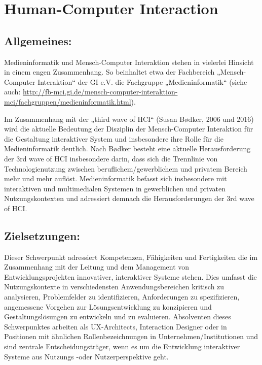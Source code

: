 \chapter{Human-Computer Interaction}\label{human-computer-interaction}

\section*{Allgemeines:}\label{allgemeines}

Medieninformatik und Mensch-Computer Interaktion stehen in vielerlei
Hinsicht in einem engen Zusammenhang. So beinhaltet etwa der Fachbereich
„Mensch-Computer Interaktion`` der GI e.V. die Fachgruppe
„Medieninformatik`` (siehe auch:
\url{http://fb-mci.gi.de/mensch-computer-interaktion-mci/fachgruppen/medieninformatik.html}).

Im Zusammenhang mit der „third wave of HCI`` (Susan Bødker, 2006 und
2016) wird die aktuelle Bedeutung der Disziplin der Mensch-Computer
Interaktion für die Gestaltung interaktiver System und insbesondere ihre
Rolle für die Medieninformatik deutlich. Nach Bødker besteht eine
aktuelle Herausforderung der 3rd wave of HCI insbesondere darin, dass
sich die Trennlinie von Technologienutzung zwischen
beruflichem/gewerblichem und privatem Bereich mehr und mehr auflöst.
Medieninformatik befasst sich insbesondere mit interaktiven und
multimedialen Systemen in gewerblichen und privaten Nutzungskontexten
und adressiert demnach die Herausforderungen der 3rd wave of HCI.

\section*{Zielsetzungen:}\label{zielsetzungen}

Dieser Schwerpunkt adressiert Kompetenzen, Fähigkeiten und Fertigkeiten
die im Zusammenhang mit der Leitung und dem Management von
Entwicklungsprojekten innovativer, interaktiver Systeme stehen. Dies
umfasst die Nutzungskontexte in verschiedensten Anwendungsbereichen
kritisch zu analysieren, Problemfelder zu identifizieren, Anforderungen
zu spezifizieren, angemessene Vorgehen zur Lösungsentwicklung zu
konzipieren und Gestaltungslösungen zu entwickeln und zu evaluieren.
Absolventen dieses Schwerpunktes arbeiten als UX-Architects, Interaction
Designer oder in Positionen mit ähnlichen Rollenbezeichnungen in
Unternehmen/Institutionen und sind zentrale Entscheidungsträger, wenn es
um die Entwicklung interaktiver Systeme aus Nutzungs -oder
Nutzerperspektive geht.

